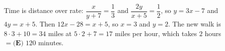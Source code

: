 Time is distance over rate: $\dfrac{x}{y+7}=\dfrac13$ and $\dfrac{2y}{x+5}=\dfrac12$, so $y=3x-7$ and $4y=x+5$. Then $12x-28=x+5$, so $x=3$ and $y=2$. The new walk is $8\cdot3+10=34$ miles at $5\cdot2+7=17$ miles per hour, which takes $2$ hours $=\boxed{\textbf{(E) }120}$ minutes.
